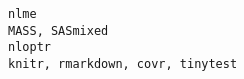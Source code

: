 \documentclass[
  letterpaper,
  DIV=11,
  numbers=noendperiod]{scrreprt}
\begin{document}
\begin{verbatim}
nlme                                                                                                                                                                                                                                                                                                                                                                                                                                                                                                                                                                                                                                                                                                                                                                                                                                                                                                                                                                                                                                                                                                                                                                                                                                                                                           MASS, SASmixed
nloptr                                                                                                                                                                                                                                                                                                                                                                                                                                                                                                                                                                                                                                                                                                                                                                                                                                                                                                                                                                                                                                                                                                                                                                                                                                                                       knitr, rmarkdown, covr, tinytest

\end{verbatim}
\end{document}
